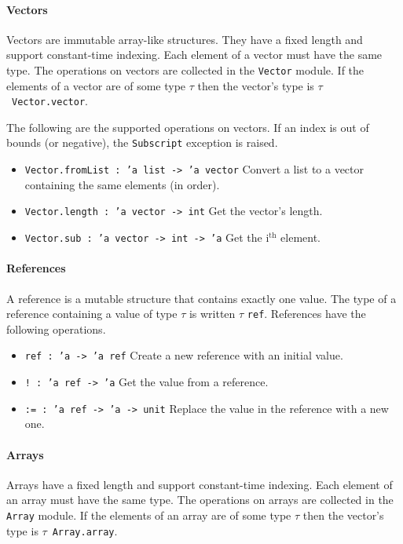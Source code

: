 \documentclass[12pt,a4paper]{book}
\begin{document}
\paragraph{Vectors}

Vectors are immutable array-like structures. They have a fixed length and support constant-time indexing. Each element of a vector must have the same type. The operations on vectors are collected in the \texttt{Vector} module. If the elements of a vector are of some type $\tau$ then the vector's type is $\tau$\ \texttt{Vector.vector}.

The following are the supported operations on vectors. If an index is out of bounds (or negative), the \texttt{Subscript} exception is raised.
\begin{itemize}
\item \texttt{Vector.fromList : 'a list -> 'a vector} Convert a list to a vector containing the same elements (in order).
\item \texttt{Vector.length : 'a vector -> int} Get the vector's length.
\item \texttt{Vector.sub : 'a vector -> int -> 'a} Get the i$^\textrm{th}$ element.
\end{itemize}

\paragraph{References}

A reference is a mutable structure that contains exactly one value. The type of a reference containing a value of type $\tau$ is written $\tau$ \texttt{ref}.
References have the following operations.
\begin{itemize}
\item
\texttt{ref : 'a -> 'a ref} Create a new reference with an initial value.
\item
\texttt{! : 'a ref -> 'a} Get the value from a reference.
\item
\texttt{:= : 'a ref -> 'a -> unit} Replace the value in the reference with a new one.
\end{itemize}

\paragraph{Arrays}

Arrays have a fixed length and support constant-time indexing. Each element of an array must have the same type. The operations on arrays are collected in the \texttt{Array} module. If the elements of an array are of some type $\tau$ then the vector's type is $\tau$\ \texttt{Array.array}.
\end{document}
